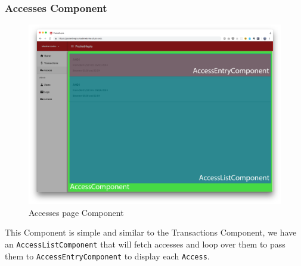 \documentclass[twoside, openright,11pt,a4paper]{book}
\begin{document}
\subsubsection{Accesses Component}
\label{accesses_component_impl}
\begin{figure}[H]
\begin{center}
	\includegraphics[width=\textwidth]{assets/screens/angular/accesses}
	\caption{Accesses page Component}
			\label{accesses_screen}
\end{center}
\end{figure}
This Component is simple and similar to the Transactions Component, we have an \verb+AccessListComponent+ that will fetch accesses and loop over them to pass them to \verb+AccessEntryComponent+ to display each \verb+Access+.
\end{document}

